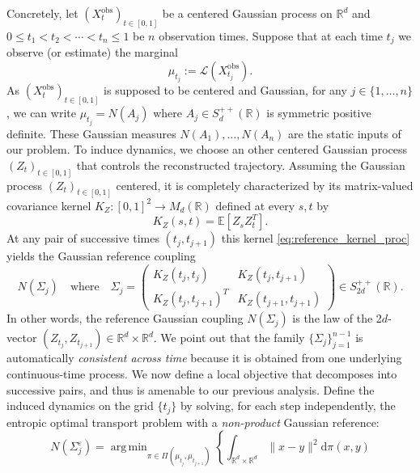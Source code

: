 \documentclass[]{article}
\newcommand{\diffd}{\mathrm{d}}
\DeclareMathOperator*{\argmin}{arg\,min}
\DeclareMathOperator{\obs}{obs}
\numberwithin{equation}{section}
\theoremstyle{plain}
\begin{document}
{Concretely, let $(X_t^{\obs})_{t \in [0,1]}$ be a centered Gaussian process on $\mathbb{R}^d$ and $0\le t_1 < t_2 < \cdots < t_n \le 1$ be $n$ observation times. Suppose that at each time $t_j$ we observe (or estimate) the marginal
\begin{equation}\label{eq:marginals}
\mu_{t_j} := \mathcal{L}(X_{t_j}^{\obs}).
\end{equation}
As $(X_t^{\obs})_{t \in [0,1]}$ is supposed to be centered and Gaussian, for any $j \in \{1,\ldots, n\}$, we can write $\mu_{t_j}  = N(A_j)$ where $A_{j}\in S_d^{++}(\mathbb{R})$ is symmetric positive definite.  These Gaussian measures $N(A_1), \ldots, N(A_n)$ are the static inputs of our problem. To induce dynamics, we choose an other centered Gaussian process $(Z_t)_{t \in [0,1]}$ that controls the reconstructed trajectory. Assuming the Gaussian process $(Z_t)_{t \in [0,1]}$ centered, it is completely characterized by its matrix-valued covariance kernel $K_Z : [0,1]^2 \rightarrow M_d(\mathbb{R})$ defined at every $s,t$ by 
\begin{equation}\label{eq:reference_kernel_proc}
	K_Z(s,t) = \mathbb{E}[Z_s Z_t^T].
\end{equation}
At any pair of successive times $(t_j, t_{j+1})$ this kernel \eqref{eq:reference_kernel_proc} yields the Gaussian reference coupling
\begin{equation}\label{eq:reference_covar_proc}
 N(\Sigma_j)
\quad \text{where} \quad
\Sigma_j=
\begin{pmatrix}
K_Z(t_j,t_j)  & K_Z(t_j,t_{j+1})\\
K_Z(t_j,t_{j+1})^T & K_Z(t_{j+1},t_{j+1})
\end{pmatrix}\in S_{2d}^{++}(\mathbb{R}).
\end{equation}
In other words, the reference Gaussian coupling $N(\Sigma_j)$ is the law of the 2$d$-vector $(Z_{t_j}, Z_{t_{j+1}}) \in \mathbb{R}^d \times \mathbb{R}^d$. We point out that the family $\{\Sigma_j\}_{j=1}^{n-1}$ is automatically \emph{consistent across time} because it is obtained from one underlying continuous-time process. We now define a local objective that decomposes into successive pairs, and thus is amenable to our previous analysis.
Define the induced dynamics on the grid $\{t_j\}$ by solving, for each step independently,
the entropic optimal transport problem with a \emph{non-product} Gaussian reference:
\begin{equation}\label{eq:time_entropic_ot_ref}
N(\Sigma_{j}^{\varepsilon}) = \argmin_{\pi\in\Pi(\mu_{t_{j}},\mu_{t_{j+1}})}
\left\{
\int_{\mathbb{R}^d\times \mathbb{R}^d}\|x-y\|^2 \diffd\pi(x,y)

\end{equation}}
\end{document}
